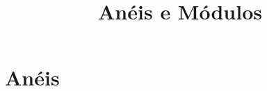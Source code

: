 \documentclass[11pt,twoside,a4paper]{book}
\title{Anéis e Módulos}
\author{}
\date{}
\begin{document}
\maketitle

\tableofcontents

\newpage

\chapter{Anéis}
\end{document}
